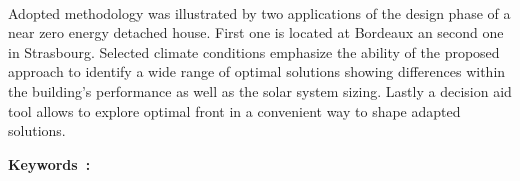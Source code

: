 \paragraph{} %
Adopted methodology was illustrated by two applications of the design phase of
a near zero energy detached house. First one is located at Bordeaux an second one
in Strasbourg. Selected climate conditions emphasize the ability of the proposed
approach to identify a wide range of optimal solutions showing differences within
the building's performance as well as the solar system sizing. Lastly a decision aid tool
allows to explore optimal front in a convenient way to shape adapted solutions.


\vfill
\noindent\textbf{Keywords~: } \keywordsENG
